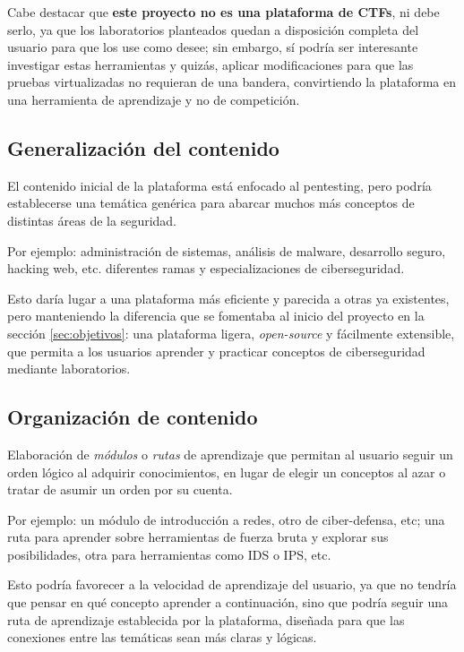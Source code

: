                 Cabe destacar que \textbf{este proyecto no es una plataforma de CTFs}, ni debe serlo, ya que los laboratorios planteados quedan a disposición completa del usuario para que los use como desee; sin embargo, sí podría ser interesante investigar estas herramientas y quizás, aplicar modificaciones para que las pruebas virtualizadas no requieran de una bandera, convirtiendo la plataforma en una herramienta de aprendizaje y no de competición.
            
        \subsection{Generalización del contenido}
            
            El contenido inicial de la plataforma está enfocado al pentesting, pero podría establecerse una temática genérica para abarcar muchos más conceptos de distintas áreas de la seguridad.
            
            Por ejemplo: administración de sistemas, análisis de malware, desarrollo seguro, hacking web, etc. diferentes ramas y especializaciones de ciberseguridad.
            
            Esto daría lugar a una plataforma más eficiente y parecida a otras ya existentes, pero manteniendo la diferencia que se fomentaba al inicio del proyecto en la sección \ref{sec:objetivos}: una plataforma ligera, \textit{open-source} y fácilmente extensible, que permita a los usuarios aprender y practicar conceptos de ciberseguridad mediante laboratorios.

        \subsection{Organización de contenido}
        
            Elaboración de \textit{módulos} o \textit{rutas} de aprendizaje que permitan al usuario seguir un orden lógico al adquirir conocimientos, en lugar de elegir un conceptos al azar o tratar de asumir un orden por su cuenta.

            Por ejemplo: un módulo de introducción a redes, otro de ciber-defensa, etc; una ruta para aprender sobre herramientas de fuerza bruta y explorar sus posibilidades, otra para herramientas como IDS o IPS, etc.

            Esto podría favorecer a la velocidad de aprendizaje del usuario, ya que no tendría que pensar en qué concepto aprender a continuación, sino que podría seguir una ruta de aprendizaje establecida por la plataforma, diseñada para que las conexiones entre las temáticas sean más claras y lógicas.

            \cleardoublepage
